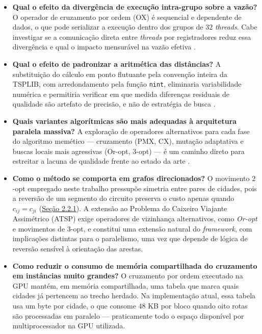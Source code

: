 \begin{itemize}
    \tightlist
    \item
          \textbf{Qual o efeito da divergência de execução intra-grupo sobre a vazão?} O operador de cruzamento por ordem (OX) é sequencial e dependente de dados, o que pode serializar a execução dentro dos grupos de \(32\) \emph{threads}.
          Cabe investigar se a comunicação direta entre \emph{threads} por registradores reduz essa divergência e qual o impacto mensurável na vazão efetiva \autocite{nvidia2024cuda,harris2007optimizing}.
    \item
          \textbf{Qual o efeito de padronizar a aritmética das distâncias?} A substituição do cálculo em ponto flutuante pela convenção inteira da TSPLIB, com arredondamento pela função \texttt{nint}, eliminaria variabilidade numérica e permitiria verificar em que medida diferenças residuais de qualidade são artefato de precisão, e não de estratégia de busca \autocite{reinelt1991tsplib}.
    \item
          \textbf{Quais variantes algorítmicas são mais adequadas à arquitetura paralela massiva?} A exploração de operadores alternativos para cada fase do algoritmo memético — cruzamento (PMX, CX), mutação adaptativa e buscas locais mais agressivas (Or-opt, \(3\)-opt) — é um caminho direto para estreitar a lacuna de qualidade frente ao estado da arte
          \autocite{larranaga1999genetic,fujimoto2011highly}.
    \item
          \textbf{Como o método se comporta em grafos direcionados?} O movimento \(2\)-opt empregado neste trabalho pressupõe simetria entre pares de cidades, pois a reversão de um segmento do circuito preserva o custo apenas quando \(c_{ij} = c_{ji}\) (\hyperref[sec-221-2opt]{Seção 2.2.1}). A extensão ao Problema do Caixeiro Viajante Assimétrico (ATSP) exige operadores de vizinhança alternativos, como \emph{Or-opt} e movimentos de \(3\)-opt, e constitui uma extensão natural do \emph{framework}, com implicações distintas para o paralelismo, uma vez que depende de lógica de reversão sensível à orientação das arestas.
    \item
          \textbf{Como reduzir o consumo de memória compartilhada do cruzamento em instâncias muito grandes?} O cruzamento por ordem executado na GPU mantém, em memória compartilhada, uma tabela que marca quais cidades já pertencem ao trecho herdado.
          Na implementação atual, essa tabela usa um byte por cidade, o que consome \(48\) KB por bloco quando oito rotas são processadas em paralelo --- praticamente todo o espaço disponível por multiprocessador na GPU utilizada.

\end{itemize}
